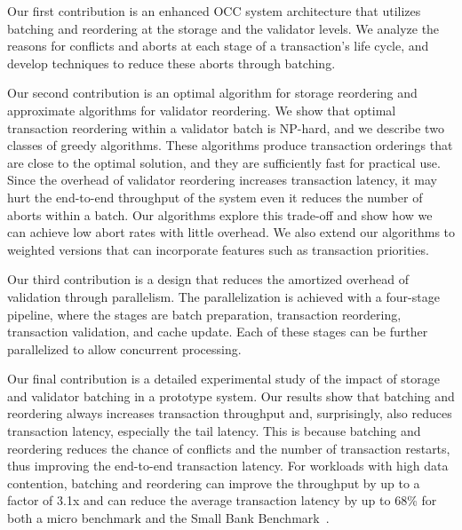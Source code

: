 Our first contribution is an enhanced OCC system architecture that utilizes batching and reordering at the storage and the validator levels. We analyze the reasons for conflicts and aborts at each stage of a transaction's life cycle, and develop techniques to reduce these aborts through batching.


Our second contribution is an optimal algorithm for storage reordering and approximate algorithms for validator reordering. We show that optimal transaction reordering within a validator batch is NP-hard, and we describe two classes of greedy algorithms. These algorithms produce transaction orderings that are close to the optimal solution, and they are sufficiently fast for practical use. Since the overhead of validator reordering increases transaction latency, it may hurt the end-to-end throughput of the system even it reduces the number of aborts within a batch. Our algorithms explore this trade-off and show how we can achieve low abort rates with little overhead. We also extend our algorithms to weighted versions that can incorporate features such as transaction priorities.



Our third contribution is a design that reduces the amortized overhead of validation through parallelism. The parallelization is achieved with a four-stage pipeline, where the stages are batch preparation, transaction reordering, transaction validation, and cache update. Each of these stages can be further parallelized to allow concurrent processing. 

Our final contribution is a detailed experimental study of the impact of storage and validator batching in a prototype system. Our results show that batching and reordering always increases transaction throughput and, surprisingly, also reduces transaction latency, especially the tail latency. This is because batching and reordering reduces the chance of conflicts and the number of transaction restarts, thus improving the end-to-end transaction latency. For workloads with high data contention, batching and reordering can improve the throughput by up to a factor of 3.1x and can reduce the average transaction latency by up to 68\% for both a micro benchmark and the Small Bank Benchmark~\cite{alomari2008icde}.

